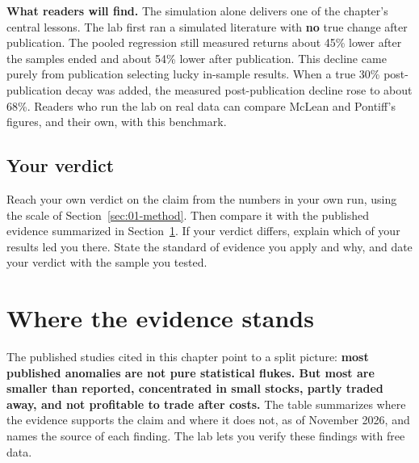 \textbf{What readers will find.} The simulation alone delivers one of the chapter's central lessons. The lab first ran a simulated literature with \textbf{no} true change after publication. The pooled regression still measured returns about 45\% lower after the samples ended and about 54\% lower after publication. This decline came purely from publication selecting lucky in-sample results. When a true 30\% post-publication decay was added, the measured post-publication decline rose to about 68\%. Readers who run the lab on real data can compare McLean and Pontiff's figures, and their own, with this benchmark.

\subsection*{Your verdict}

Reach your own verdict on the claim from the numbers in your own run, using the scale of Section~\ref{sec:01-method}. Then compare it with the published evidence summarized in Section~\ref{sec:19-verdict}. If your verdict differs, explain which of your results led you there. State the standard of evidence you apply and why, and date your verdict with the sample you tested.

\section{Where the evidence stands}
\label{sec:19-verdict}

The published studies cited in this chapter point to a split picture: \textbf{most published anomalies are not pure statistical flukes. But most are smaller than reported, concentrated in small stocks, partly traded away, and not profitable to trade after costs.} The table summarizes where the evidence supports the claim and where it does not, as of November 2026, and names the source of each finding. The lab lets you verify these findings with free data.

